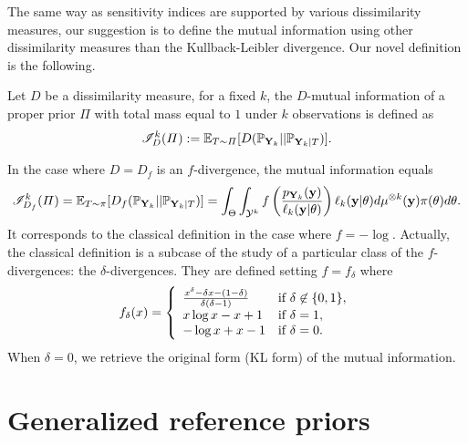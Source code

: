 The same way as sensitivity indices are supported by various dissimilarity measures, our suggestion is to define the mutual information using other dissimilarity measures than the Kullback-Leibler divergence.
Our novel definition is the following.
\begin{defi}
    Let $D$ be a dissimilarity measure, for a fixed $k$, the $D$-mutual information of a proper prior $\varPi$ with total mass equal to $1$ under $k$ observations is defined as
        \begin{equation}
            \mathscr{I}_D^k(\varPi) := \mathbb{E}_{T\sim\varPi}[D(\mathbb{P}_{\mathbf{Y}_k}||\mathbb{P}_{\mathbf{Y}_k|T} )].
        \end{equation}
\end{defi}

In the case where $D=D_f$ is an $f$-divergence, the mutual information equals
    \begin{equation}
        \mathscr{I}_{D_f}^k(\varPi) =\mathbb{E}_{T\sim\pi}[D_f(\mathbb{P}_{\mathbf{Y}_k}||\mathbb{P}_{\mathbf{Y}_k|T})] = \int_\Theta\int_{\mathcal{Y}^k}f\left( \frac{p_{\mathbf{Y}_k}(\mathbf{y})}{\ell_k(\mathbf{y}|\theta)} \right) \ell_k(\mathbf{y}|\theta)d\mu^{\otimes k}(\mathbf{y}) \pi(\theta)d\theta.
    \end{equation}
It corresponds to  the classical definition in the case where $f=-\log$. Actually, the classical definition is a subcase of the study of a particular class of the $f$-divergences:  the $\delta$-divergences. They are defined setting $f=f_\delta$ where 
\begin{equation}
    f_\delta(x) = \left\lbrace\begin{array}{l l} \frac{x^\delta-\delta x-(1-\delta)}{\delta(\delta-1)} & \text{if\ }\delta\not\in\{0,1\},\\ 
        x\log x-x+1  & \text{if\ }\delta=1, \\
        -\log x +x -1 & \text{if\ }\delta=0.
    \end{array}\right. 
\end{equation}    
When $\delta=0$, we retrieve the original form (KL form) of the mutual information.


\section{Generalized reference priors}\label{sec:PSGSA:generefp}


